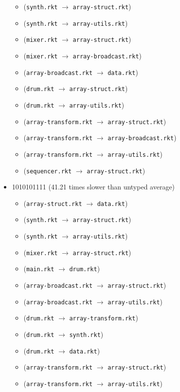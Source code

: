 \documentclass{article}
\newcommand{\mono}[1]{\texttt{#1}}
\begin{document}
\begin{itemize}
\begin{itemize}
  \item (\mono{synth.rkt} $\rightarrow$ \mono{array-struct.rkt})
  \item (\mono{synth.rkt} $\rightarrow$ \mono{array-utils.rkt})
  \item (\mono{mixer.rkt} $\rightarrow$ \mono{array-struct.rkt})
  \item (\mono{mixer.rkt} $\rightarrow$ \mono{array-broadcast.rkt})
  \item (\mono{array-broadcast.rkt} $\rightarrow$ \mono{data.rkt})
  \item (\mono{drum.rkt} $\rightarrow$ \mono{array-struct.rkt})
  \item (\mono{drum.rkt} $\rightarrow$ \mono{array-utils.rkt})
  \item (\mono{array-transform.rkt} $\rightarrow$ \mono{array-struct.rkt})
  \item (\mono{array-transform.rkt} $\rightarrow$ \mono{array-broadcast.rkt})
  \item (\mono{array-transform.rkt} $\rightarrow$ \mono{array-utils.rkt})
  \item (\mono{sequencer.rkt} $\rightarrow$ \mono{array-struct.rkt})
  \end{itemize}
\item 1010101111 (41.21 times slower than untyped average)
  \begin{itemize}
  \item (\mono{array-struct.rkt} $\rightarrow$ \mono{data.rkt})
  \item (\mono{synth.rkt} $\rightarrow$ \mono{array-struct.rkt})
  \item (\mono{synth.rkt} $\rightarrow$ \mono{array-utils.rkt})
  \item (\mono{mixer.rkt} $\rightarrow$ \mono{array-struct.rkt})
  \item (\mono{main.rkt} $\rightarrow$ \mono{drum.rkt})
  \item (\mono{array-broadcast.rkt} $\rightarrow$ \mono{array-struct.rkt})
  \item (\mono{array-broadcast.rkt} $\rightarrow$ \mono{array-utils.rkt})
  \item (\mono{drum.rkt} $\rightarrow$ \mono{array-transform.rkt})
  \item (\mono{drum.rkt} $\rightarrow$ \mono{synth.rkt})
  \item (\mono{drum.rkt} $\rightarrow$ \mono{data.rkt})
  \item (\mono{array-transform.rkt} $\rightarrow$ \mono{array-struct.rkt})
  \item (\mono{array-transform.rkt} $\rightarrow$ \mono{array-utils.rkt})

\end{itemize}
\end{itemize}
\end{document}
